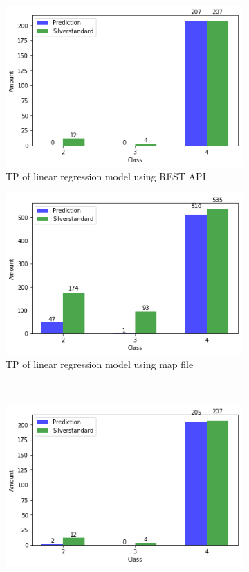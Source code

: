 \documentclass[runningheads]{llncs}
\begin{document}
    \begin{figure}[H]
        \begin{subfigure}{.5\textwidth}
            \includegraphics[scale=0.35]{lrREST.png}
            \caption{TP of linear regression model using REST API}
        \end{subfigure}
        \begin{subfigure}{.4\textwidth}
            \includegraphics[scale=0.35]{lrFile.png}
            \caption{TP of linear regression model using map file}
        \end{subfigure}
        \\
        \begin{subfigure}{.5\textwidth}
            \includegraphics[scale=0.35]{rfREST.png}

\end{subfigure}
\end{figure}
\end{document}
